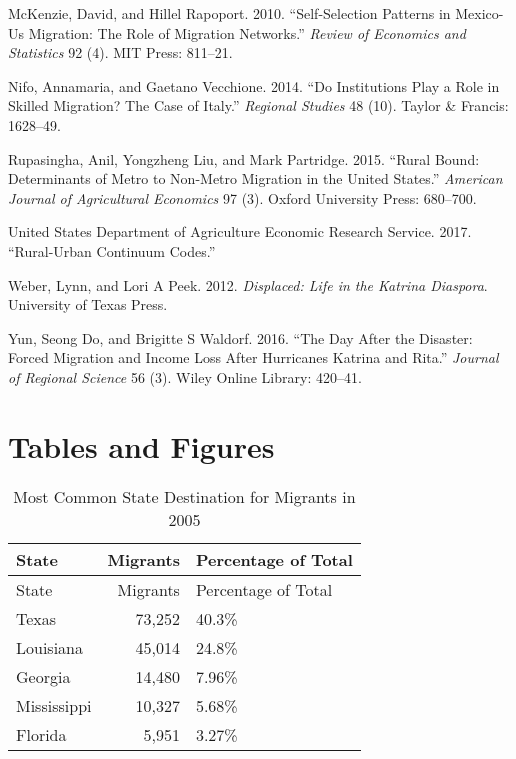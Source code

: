 \documentclass[]{article}
\begin{document}
\hypertarget{ref-mckenzie2010self}{}
McKenzie, David, and Hillel Rapoport. 2010. ``Self-Selection Patterns in
Mexico-Us Migration: The Role of Migration Networks.'' \emph{Review of
Economics and Statistics} 92 (4). MIT Press: 811--21.

\hypertarget{ref-nifo2014institutions}{}
Nifo, Annamaria, and Gaetano Vecchione. 2014. ``Do Institutions Play a
Role in Skilled Migration? The Case of Italy.'' \emph{Regional Studies}
48 (10). Taylor \& Francis: 1628--49.

\hypertarget{ref-rupasingha2015rural}{}
Rupasingha, Anil, Yongzheng Liu, and Mark Partridge. 2015. ``Rural
Bound: Determinants of Metro to Non-Metro Migration in the United
States.'' \emph{American Journal of Agricultural Economics} 97 (3).
Oxford University Press: 680--700.

\hypertarget{ref-ersruuc}{}
United States Department of Agriculture Economic Research Service. 2017.
``Rural-Urban Continuum Codes.''

\hypertarget{ref-weber2012displaced}{}
Weber, Lynn, and Lori A Peek. 2012. \emph{Displaced: Life in the Katrina
Diaspora}. University of Texas Press.

\hypertarget{ref-yun2016day}{}
Yun, Seong Do, and Brigitte S Waldorf. 2016. ``The Day After the
Disaster: Forced Migration and Income Loss After Hurricanes Katrina and
Rita.'' \emph{Journal of Regional Science} 56 (3). Wiley Online Library:
420--41.

\clearpage

\section{Tables and Figures}\label{tables-and-figures}

\begin{longtable}[]{@{}lrl@{}}
\caption{Most Common State Destination for Migrants in 2005
\label{tab:commondeststate}}\tabularnewline
\toprule
State & Migrants & Percentage of Total\tabularnewline
\midrule
\endfirsthead
\toprule
State & Migrants & Percentage of Total\tabularnewline
\midrule
\endhead
Texas & 73,252 & 40.3\%\tabularnewline
Louisiana & 45,014 & 24.8\%\tabularnewline
Georgia & 14,480 & 7.96\%\tabularnewline
Mississippi & 10,327 & 5.68\%\tabularnewline
Florida & 5,951 & 3.27\%\tabularnewline
\bottomrule
\end{longtable}

\clearpage
\end{document}
